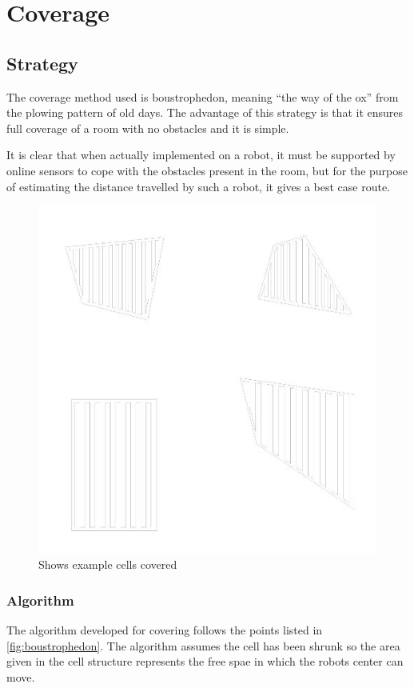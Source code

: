 \chapter{Coverage}\label{chap:coverage}

\section{ Strategy }
The coverage method used is boustrophedon, meaning “the way of the ox” from the
plowing pattern of old days. The advantage of this strategy is that it ensures
full coverage of a room with no obstacles and it is simple.

It is clear that when actually implemented on a robot, it must be supported by
online sensors to cope with the obstacles present in the room, but for the
purpose of estimating the distance travelled by such a robot, it gives a best
case route.

\begin{figure}[htb]
	\centering
	\includegraphics[width=0.3\paperwidth,trim=0 0 0
	0]{graphics/covered_cells.jpg}
	\caption{Shows example cells covered}
	\label{fig:covered_cells}			
\end{figure}

\subsection{Algorithm}
The algorithm developed for covering follows the points listed in
\ref{fig:boustrophedon}. The algorithm assumes the cell has been shrunk so the
area given in the cell structure represents the free spae in which the robots center
can move.

